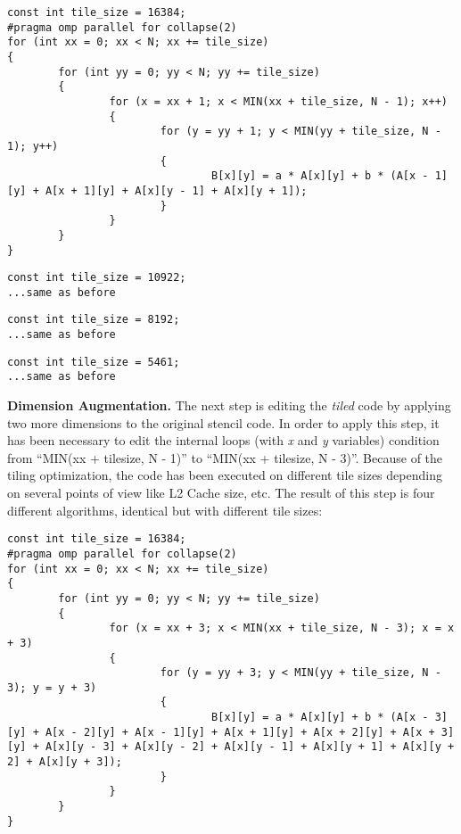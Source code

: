 \documentclass[conference]{IEEEtran}
\newcommand{\mypar}[1]{{\bf #1.}}
\begin{document}
\renewcommand{\lstlistingname}{Algorithm}

\begin{lstlisting}[caption= Tiling with size of 16384]
const int tile_size = 16384;
#pragma omp parallel for collapse(2)
for (int xx = 0; xx < N; xx += tile_size)
{
		for (int yy = 0; yy < N; yy += tile_size)
		{
				for (x = xx + 1; x < MIN(xx + tile_size, N - 1); x++)
				{
						for (y = yy + 1; y < MIN(yy + tile_size, N - 1); y++)
						{
								B[x][y] = a * A[x][y] + b * (A[x - 1][y] + A[x + 1][y] + A[x][y - 1] + A[x][y + 1]);
						}
				}
		}
}
\end{lstlisting}

\begin{lstlisting}[caption= Tiling with size of 10922]
const int tile_size = 10922;
...same as before
\end{lstlisting}

\begin{lstlisting}[caption= Tiling with size of 8192]
const int tile_size = 8192;
...same as before
\end{lstlisting} 

\begin{lstlisting}[caption= Tiling with size of 5461]
const int tile_size = 5461;
...same as before
\end{lstlisting}

\mypar{Dimension Augmentation}
The next step is editing the \textit{tiled} code by applying two more dimensions to the original stencil code. In order to apply this step, it has been necessary to edit the internal loops (with \textit{x} and \textit{y} variables) condition from ``MIN(xx + tile\textunderscore size, N - 1)'' to ``MIN(xx + tile\textunderscore size, N - 3)''. Because of the tiling optimization, the code has been executed on different tile sizes depending on several points of view like L2 Cache size, etc. The result of this step is four different algorithms, identical but with different tile sizes:

\renewcommand{\lstlistingname}{Algorithm}

\begin{lstlisting}
const int tile_size = 16384;
#pragma omp parallel for collapse(2)
for (int xx = 0; xx < N; xx += tile_size)
{
		for (int yy = 0; yy < N; yy += tile_size)
		{
				for (x = xx + 3; x < MIN(xx + tile_size, N - 3); x = x + 3)
				{
						for (y = yy + 3; y < MIN(yy + tile_size, N - 3); y = y + 3)
						{
								B[x][y] = a * A[x][y] + b * (A[x - 3][y] + A[x - 2][y] + A[x - 1][y] + A[x + 1][y] + A[x + 2][y] + A[x + 3][y] + A[x][y - 3] + A[x][y - 2] + A[x][y - 1] + A[x][y + 1] + A[x][y + 2] + A[x][y + 3]);
						}
				}
		}
}
\end{lstlisting}
\end{document}
